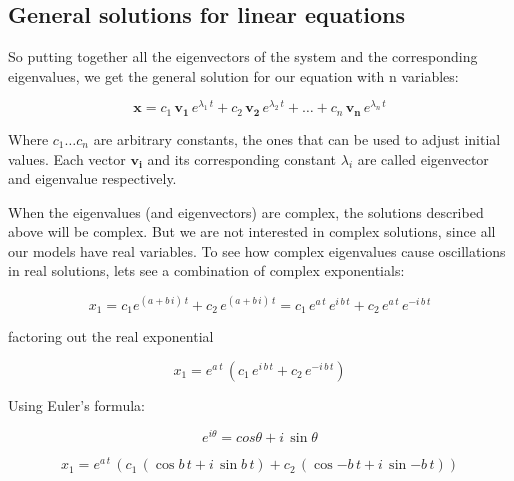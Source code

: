 \documentclass[12pt]{article}
\begin{document}
\subsection{General solutions for linear equations}

So putting together all the eigenvectors of the system and the corresponding eigenvalues, we get the general solution for our equation with n variables:


\begin{equation}
	\label{odenvar_mat_sol}
	\mathbf{x}= c_1 \, \mathbf{v_1} \, e^{\lambda_1 \, t} + c_2 \, \mathbf{v_2} \, e^{\lambda_2 \, t} +  \dots + c_n \, \mathbf{v_n} \, e^{\lambda_n \, t} 
\end{equation}

Where $c_1 \dots c_n$  are arbitrary constants, the ones that can be used to adjust initial values. Each vector $\mathbf{v_i}$ and its corresponding constant $\lambda_i$ are called eigenvector and eigenvalue respectively.


When the eigenvalues (and eigenvectors) are complex, the solutions described above will be complex. But we are not interested in complex solutions, since all our models have real variables. To see how complex eigenvalues cause oscillations in real solutions, lets see a combination of complex exponentials:

\begin{equation}
	x_1= c_1 e^{\left(  a + b\, i\right) \, t} + c_2 \,  e^{\left(  a + b\, i\right)\, t} = 
	c_1  \, e^{a \, t} \, e^{ i \, b \, t} + c_2 \,  e^{a \, t} \, e^{-i \, b \, t} 
	\nonumber
\end{equation}

factoring out the real exponential

\begin{equation}
x_1= e^{a \, t} \,  \left( c_1  \, e^{ i \, b \, t} + c_2 \,  e^{-i \, b \, t}\right) \nonumber
\end{equation}

Using Euler's formula:

\begin{equation}
	\label{euler}
	e^{i \theta} = cos \theta + i \, \sin \theta 
\end{equation}

\begin{equation}
	x_1= e^{a \, t} \,  \left( c_1  \, \left(  \cos{ b \, t} + i \, \sin{ b \, t} \right)+ c_2 \, \left( \cos{- b \, t} + i \, \sin{- b \, t} \right) \right) \nonumber
\end{equation}
\end{document}
